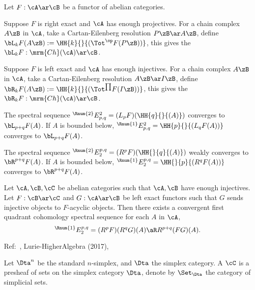 \documentclass[article, a4paper, twoside]{universal}
\begin{document}
\begin{dfn}[5.7.4, 5.7.9]
    Let $F:\cA\ar\cB$ be a functor of abelian categories.

    \begin{itm}
        \item Suppose $F$ is right exact and $\cA$ has enough projectives. For a chain complex $A\zB$ in $\cA$, take a Cartan-Eilenberg resolution $P\zB\ar A\zB$, define $\bL_{k}F(A\zB):=\HH{k}{}{(\Tot^{\op}F(P\zB))}$, this gives the  $\bL_{k}F:\mrm{Ch}(\cA)\ar\cB$.
        \item Suppose $F$ is left exact and $\cA$ has enough injectives. For a chain complex $A\zB$ in $\cA$, take a Cartan-Eilenberg resolution $A\zB\ar I\zB$, define $\bR_{k}F(A\zB):=\HH{k}{}{(\Tot^{\prod}F(I\zB))}$, this gives the  $\bR_{k}F:\mrm{Ch}(\cA)\ar\cB$.
    \end{itm}

\end{dfn}

\begin{thm}[5.7.6, 5.7.9]
    The spectral sequence ${}^{\Rnum{2}}E_{p,q}^{2}=(L_{p}F)(\HH{q}{}{(A)})$ converges to $\bL_{p+q}F(A)$. If $A$ is bounded below, ${}^{\Rnum{1}}E_{p,q}^{2}=\HH{p}{}{(L_{q}F(A))}$ converges to $\bL_{p+q}F(A)$.

    The spectral sequence ${}^{\Rnum{2}}E_{2}^{p,q}=(R^{p}F)(\HH{}{q}{(A)})$ weakly converges to $\bR^{p+q}F(A)$. If $A$ is bounded below, ${}^{\Rnum{1}}E_{2}^{p,q}=\HH{}{p}{(R^{q}F(A))}$ converges to $\bR^{p+q}F(A)$.
\end{thm}

\begin{thm}[Grothendieck, 5.8.3]
    Let $\cA,\cB,\cC$ be abelian categories such that $\cA,\cB$ have enough injectives. Let $F:\cB\ar\cC$ and $G:\cA\ar\cB$ be left exact functors such that $G$ sends injective objects to $F$-acyclic objects. Then there exists a convergent first quadrant cohomology spectral sequence for each $A$ in $\cA$,
    \[
        {}^{\Rnum{1}}E_{2}^{p,q}=(R^{p}F)(R^{q}G)(A)\aR R^{p+q}(FG)(A).
    \]
\end{thm}

Ref:~\cite{Lurie2009}, Lurie-HigherAlgebra (2017),


\begin{dfn}
    Let $\Dta^{n}$ be the standard $n$-simplex, and $\Dta$ the simplex category. A  $\cC$ is a presheaf of sets on the simplex category $\Dta$, denote by $\Set_{\Dta}$ the category of simplicial sets.
\end{dfn}
\end{document}
